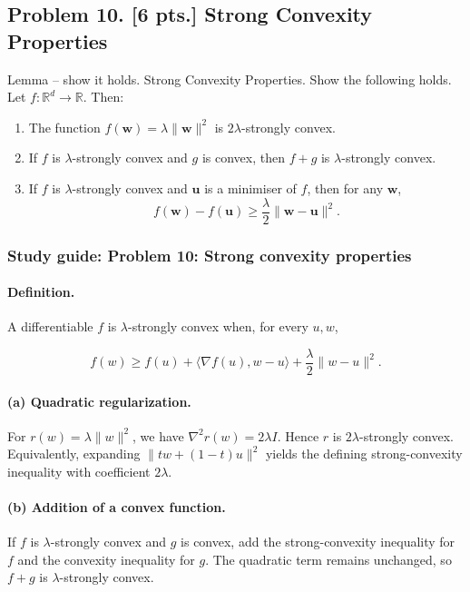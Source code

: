 \documentclass[11pt,a4paper]{article}
\begin{document}
\subsection{Problem 10. [6 pts.] Strong Convexity Properties}
Lemma -- show it holds. Strong Convexity Properties. Show the following holds.
Let $f : \mathbb{R}^{d} \to \mathbb{R}$. Then:
\begin{enumerate}[label=(\alph*)]
    \item The function $f(\mathbf{w}) = \lambda \|\mathbf{w}\|^{2}$ is $2\lambda$-strongly convex.
    \item If $f$ is $\lambda$-strongly convex and $g$ is convex, then $f + g$ is $\lambda$-strongly convex.
    \item If $f$ is $\lambda$-strongly convex and $\mathbf{u}$ is a minimiser of $f$, then for any $\mathbf{w}$,
    \[
    f(\mathbf{w}) - f(\mathbf{u}) \ge \frac{\lambda}{2} \|\mathbf{w} - \mathbf{u}\|^{2}.
    \]
\end{enumerate}


\subsubsection{Study guide: Problem 10: Strong convexity properties}

\paragraph{Definition.}

A differentiable $f$ is $\lambda$-strongly convex when, for every $u,w$,

\[
f(w)
\geq
f(u)+\langle \nabla f(u),w-u\rangle
+\frac{\lambda}{2}\|w-u\|^2.
\]

\paragraph{(a) Quadratic regularization.}

For $r(w)=\lambda\|w\|^2$, we have $\nabla^2r(w)=2\lambda I$. Hence $r$ is $2\lambda$-strongly convex. Equivalently, expanding $\|tw+(1-t)u\|^2$ yields the defining strong-convexity inequality with coefficient $2\lambda$.

\paragraph{(b) Addition of a convex function.}

If $f$ is $\lambda$-strongly convex and $g$ is convex, add the strong-convexity inequality for $f$ and the convexity inequality for $g$. The quadratic term remains unchanged, so $f+g$ is $\lambda$-strongly convex.
\end{document}
